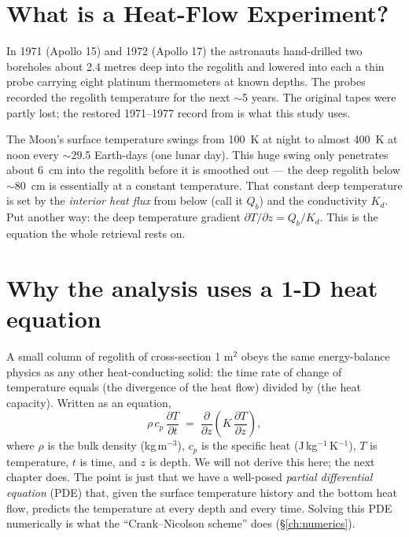 \documentclass[11pt]{report}
\begin{document}
\section{What is a Heat-Flow Experiment?}

In 1971 (Apollo 15) and 1972 (Apollo 17) the astronauts hand-drilled
two boreholes about 2.4 metres deep into the regolith and lowered
into each a thin probe carrying eight platinum thermometers at
known depths. The probes recorded the regolith temperature for the
next $\sim$5 years. The original tapes were partly lost; the
restored 1971--1977 record from \citet{nagihara2018} is what this
study uses.

\begin{key}
The Moon's surface temperature swings from 100~K at night to almost
400~K at noon every $\sim$29.5 Earth-days (one lunar day). This
huge swing only penetrates about 6~cm into the regolith before it
is smoothed out --- the deep regolith below $\sim$80~cm is
essentially at a constant temperature. That constant deep
temperature is set by the \emph{interior heat flux} from below
(call it $Q_b$) and the conductivity $K_d$. Put another way: the
deep temperature gradient $\partial T / \partial z = Q_b / K_d$.
This is the equation the whole retrieval rests on.
\end{key}

\section{Why the analysis uses a 1-D heat equation}

A small column of regolith of cross-section 1 m$^2$ obeys the same
energy-balance physics as any other heat-conducting solid:
the time rate of change of temperature equals (the divergence of
the heat flow) divided by (the heat capacity). Written as an
equation,
\[
\rho \, c_p \, \frac{\partial T}{\partial t}
   \;=\; \frac{\partial}{\partial z}\!\left(K \, \frac{\partial T}{\partial z}\right),
\]
where $\rho$ is the bulk density (kg\,m$^{-3}$), $c_p$ is the
specific heat (J\,kg$^{-1}$\,K$^{-1}$), $T$ is temperature, $t$ is
time, and $z$ is depth. We will not derive this here; the next
chapter does. The point is just that we have a well-posed
\emph{partial differential equation} (PDE) that, given the surface
temperature history and the bottom heat flow, predicts the
temperature at every depth and every time. Solving this PDE
numerically is what the ``Crank--Nicolson scheme'' does
(\S\ref{ch:numerics}).
\end{document}
